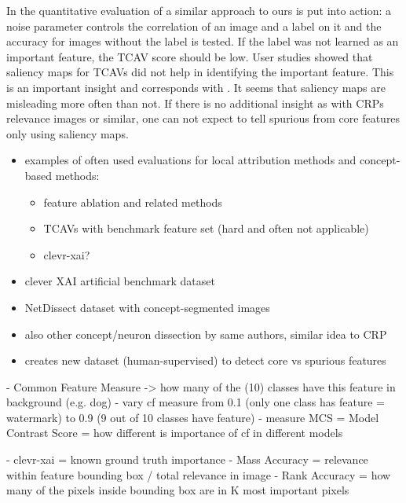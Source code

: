 In the quantitative evaluation of \cite{Kim2018} a similar approach to ours is put into action:
a noise parameter controls the correlation of an image and a label on it and the accuracy for images without the label is tested. If the label was not learned as an important feature, the TCAV score should be low. User studies showed that saliency maps for TCAVs did not help in identifying the important feature. This is an important insight and corresponds with \cite{Sixt2022a}. It seems that saliency maps are misleading more often than not. If there is no additional insight as with CRPs relevance images or similar, one can not expect to tell spurious from core features only using saliency maps.

\begin{itemize}
      \item examples of often used evaluations for local attribution methods and concept-based methods:
            \begin{itemize}
                  \item feature ablation and related methods
                  \item TCAVs \cite{Kim2018} with benchmark feature set (hard and often not applicable)
                  \item clevr-xai? \cite{Arras2022}
            \end{itemize}
      \item clever XAI artificial benchmark dataset \cite{Arras2022}
      \item NetDissect dataset with concept-segmented images \cite{Bau2017}
      \item also other concept/neuron dissection by same authors, similar idea to CRP \cite{Bau2020}
      \item creates new dataset (human-supervised) to detect core vs spurious features \cite{Singla2022}
\end{itemize}

\cite{Yang2019}
- Common Feature Measure -> how many of the (10) classes have this feature in background (e.g. dog)
- vary cf measure from 0.1 (only one class has feature = watermark) to 0.9 (9 out of 10 classes have feature)
- measure MCS = Model Contrast Score = how different is importance of cf in different models

\cite{Arras2022}
- clevr-xai = known ground truth importance
- Mass Accuracy = relevance within feature bounding box / total relevance in image
- Rank Accuracy = how many of the pixels inside bounding box are in K most important pixels


